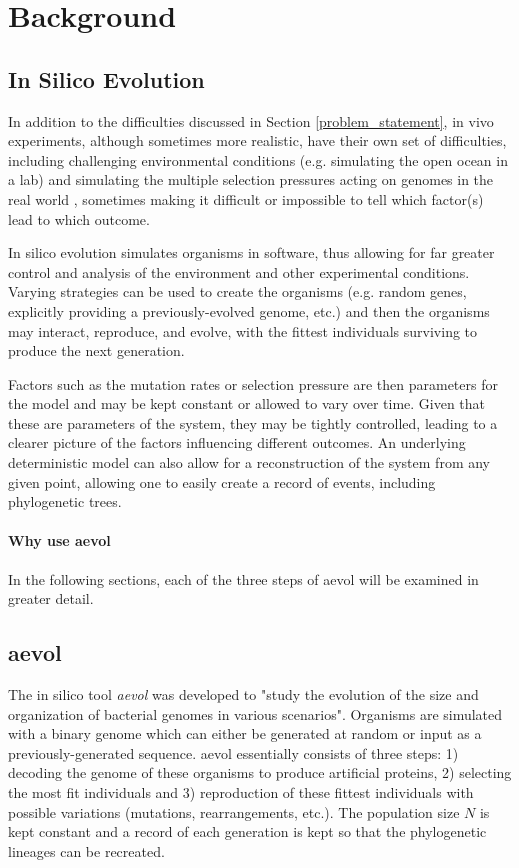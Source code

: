 \chapter{Background}\label{ch:background}

\section{In Silico Evolution}
In addition to the difficulties discussed in Section \ref{problem_statement}, in vivo experiments, although sometimes more realistic, have their own set of difficulties, including challenging environmental conditions (e.g. simulating the open ocean in a lab) and simulating the multiple selection pressures acting on genomes in the real world \cite{Batut.2013}, sometimes making it difficult or impossible to tell which factor(s) lead to which outcome. 

In silico evolution simulates organisms in software, thus allowing for far greater control and analysis of the environment and other experimental conditions. Varying strategies can be used to create the organisms (e.g. random genes, explicitly providing a previously-evolved genome, etc.) and then the organisms may interact, reproduce, and evolve, with the fittest individuals surviving to produce the next generation. 

Factors such as the mutation rates or selection pressure are then parameters for the model and may be kept constant or allowed to vary over time. Given that these are parameters of the system, they may be tightly controlled, leading to a clearer picture of the factors influencing different outcomes. An underlying deterministic model can also allow for a reconstruction of the system from any given point, allowing one to easily create a record of events, including phylogenetic trees. 

\subsubsection{Why use aevol}

In the following sections, each of the three steps of aevol will be examined in greater detail.

\section{aevol}
The in silico tool \textit{aevol} was developed to "study the evolution of the size and organization of bacterial genomes in various scenarios"\cite{Batut.2013}. Organisms are simulated with a binary genome which can either be generated at random or input as a previously-generated sequence. aevol essentially consists of three steps: 1) decoding the genome of these organisms to produce artificial proteins, 2) selecting the most fit individuals and 3) reproduction of these fittest individuals with possible variations (mutations, rearrangements, etc.). The population size $N$ is kept constant and a record of each generation is kept so that the phylogenetic lineages can be recreated.

